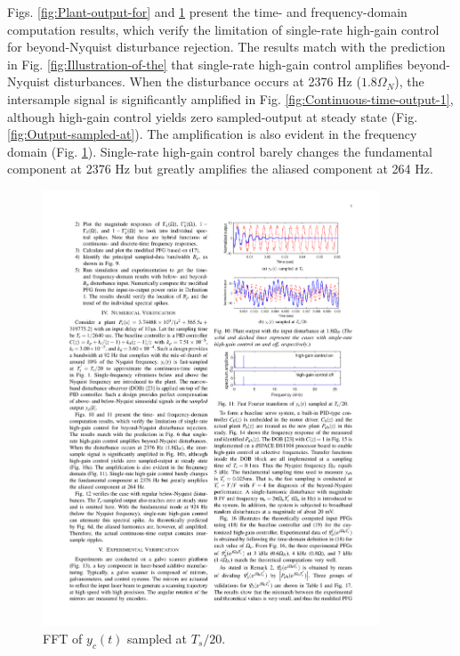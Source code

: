 \documentclass [11pt, proquest] {uwthesis}[2020/02/24]
\begin{document}
Figs. \ref{fig:Plant-output-for} and \ref{fig:disturbance-at-1.8}
present the time- and frequency-domain computation results, which
verify the limitation of single-rate high-gain control for beyond-Nyquist
disturbance rejection. The results match with the prediction in Fig.
\ref{fig:Illustration-of-the} that single-rate high-gain control
amplifies beyond-Nyquist disturbances. When the disturbance occurs
at 2376 Hz ($1.8\Omega_{N}$), the intersample signal is significantly
amplified in Fig. \ref{fig:Continuous-time-output-1}, although high-gain
control yields zero sampled-output at steady state (Fig. \ref{fig:Output-sampled-at}).
The amplification is also evident in the frequency domain (Fig. \ref{fig:disturbance-at-1.8}).
Single-rate high-gain control barely changes the fundamental component
at 2376 Hz but greatly amplifies the aliased component at 264 Hz.
\begin{figure}[!ht]
\begin{centering}
\includegraphics[width=10cm]{Spectral-analysis/FIG11.pdf}
\par\end{centering}
\caption{\label{fig:disturbance-at-1.8}FFT of $y_{c}(t)$
sampled at $T_{s}/20$.}
\end{figure}
\end{document}

